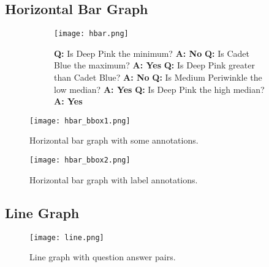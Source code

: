 \documentclass{article} \usepackage{iclr2018_workshop,times}
\begin{document}
\subsection{Horizontal Bar Graph}
\begin{figure}[h]
    \centering
    \caption{Horizontal bar graph with question answer pairs.}
    \label{fig:hbar_qa}
    \begin{subfigure}[]{0.66\textwidth}
        \texttt{[image: hbar.png]}
    \end{subfigure}
    \begin{subfigure}[]{0.33\textwidth}
        \textbf{Q:} Is Deep Pink the minimum?\newline
        \textbf{A: No}\newline\newline
        \textbf{Q:} Is Cadet Blue the maximum?\newline
        \textbf{A: Yes}\newline\newline
        \textbf{Q:} Is Deep Pink greater than Cadet Blue?\newline
        \textbf{A: No}\newline\newline
        \textbf{Q:} Is Medium Periwinkle the low median?\newline
        \textbf{A: Yes}\newline\newline
        \textbf{Q:} Is Deep Pink the high median?\newline
        \textbf{A: Yes}
    \end{subfigure}
\end{figure}

\begin{SCfigure}[][h]
    \texttt{[image: hbar\_bbox1.png]}
    \caption{Horizontal bar graph with some annotations.}
    \label{fig:hbar_anno}
\end{SCfigure}

\begin{SCfigure}[][h]
    \texttt{[image: hbar\_bbox2.png]}
    \caption{Horizontal bar graph with label annotations.}
    \label{fig:hbar_anno2}
\end{SCfigure}

\clearpage

\subsection{Line Graph}
\begin{figure}[h]
    \centering
    \caption{Line graph with question answer pairs.}
    \texttt{[image: line.png]}
\end{figure}
\end{document}
